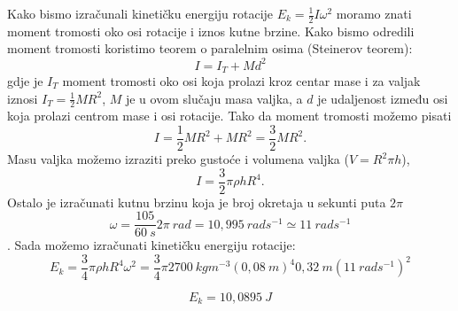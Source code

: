 
Kako bismo izračunali kinetičku energiju rotacije $E_k= \frac{1}{2}I\omega^2$ moramo znati moment tromosti oko osi rotacije i iznos kutne brzine. Kako bismo odredili moment tromosti koristimo teorem o paralelnim osima (Steinerov teorem):
$$ I=I_T+Md^2 $$
gdje je $I_T$ moment tromosti oko osi koja prolazi kroz centar mase i za valjak iznosi $I_T=\frac{1}{2}MR^2$, $M$ je u ovom slučaju masa valjka, a $d$ je udaljenost između osi koja prolazi centrom mase i osi rotacije. Tako da moment tromosti možemo pisati 
$$I=\frac{1}{2}MR^2+MR^2=\frac{3}{2}MR^2. $$
Masu valjka možemo izraziti preko gustoće i volumena valjka ($V=R^2\pi h$), 
$$I=\frac{3}{2}\pi\rho h  R^4 .$$
Ostalo je izračunati kutnu brzinu koja je broj okretaja u sekunti puta $2\pi$
$$\omega=\frac{105}{60\ s}2\pi\ rad=10,995\ rads^{-1}\simeq11\ rads^{-1} $$.
Sada možemo izračunati kinetičku energiju rotacije:
$$E_k= \frac{3}{4}\pi\rho h  R^4 \omega^2 =\frac{3}{4}\pi 2700\ kgm^{-3}(0,08\ m)^4 0,32\ m (11\  rads^{-1})^2
$$

$$E_k=10,0895\ J $$
